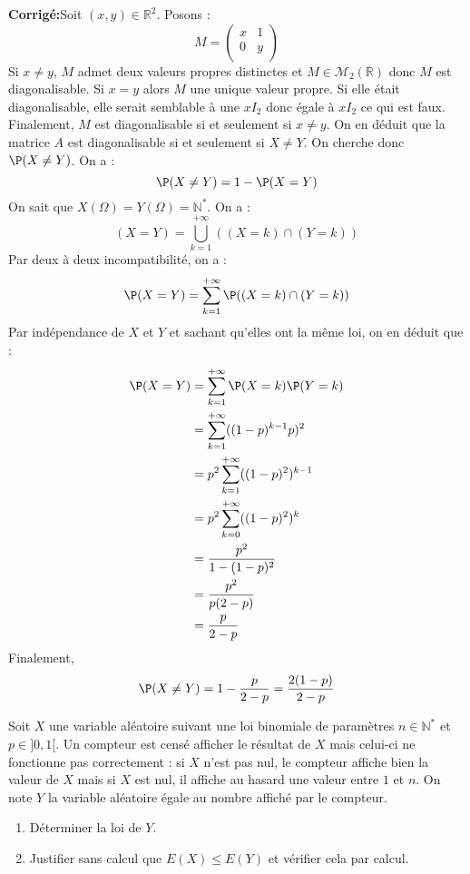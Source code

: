 \documentclass[a4paper,twoside,french,11pt]{VcCours}
\newcommand{\corr}{\textbf{Corrigé:}}
\begin{document}
\corr Soit $(x,y) \in \mathbb{R}^2$. Posons :
$$ M = \begin{pmatrix}
x & 1 \\
0 & y \\
\end{pmatrix}$$
Si $x \neq y$, $M$ admet deux valeurs propres distinctes et $M \in \mathcal{M}_2(\mathbb{R})$ donc $M$ est diagonalisable. Si $x=y$ alors $M$ une unique valeur propre. Si elle était diagonalisable, elle serait semblable à une $x I_2$ donc égale à $x I_2$ ce qui est faux. Finalement, $M$ est diagonalisable si et seulement si $x \ne y$. On en déduit que la matrice $A$ est diagonalisable si et seulement si $X \neq Y$. On cherche donc $\P(X \neq Y)$. On a :
$$ \P(X \neq Y) = 1 - \P(X=Y)$$
On sait que $X(\Omega)= Y(\Omega)= \mathbb{N}^*$. On a :
$$ (X=Y) = \bigcup_{k=1}^{+ \infty} ((X=k) \cap (Y=k))$$
Par deux à deux incompatibilité, on a :
$$  \P(X=Y) = \sum_{k=1}^{+ \infty} \P((X=k) \cap (Y=k))$$
Par indépendance de $X$ et $Y$ et sachant qu'elles ont la même loi, on en déduit que :
\begin{align*}
 \P(X=Y) & = \sum_{k=1}^{+ \infty} \P(X=k) \P(Y=k) \\
 & = \sum_{k=1}^{+ \infty} ((1-p)^{k-1} p)^2 \\
 & = p^2 \sum_{k=1}^{+ \infty} ((1-p)^{2})^{k-1} \\
 & = p^2 \sum_{k=0}^{+ \infty} ((1-p)^{2})^{k} \\
 & = \dfrac{p^2}{1-(1-p)^{2}}\\
 & = \dfrac{p^2}{p(2-p)} \\
 & = \dfrac{p}{2-p}
\end{align*}
Finalement,
$$ \P(X \neq Y) = 1 - \dfrac{p}{2-p} = \dfrac{2(1-p)}{2-p}$$

\begin{Exercice}{} Soit $X$ une variable aléatoire suivant une loi binomiale de paramètres $n \in \mathbb{N}^*$ et $p \in ]0,1[$. Un compteur est censé afficher le résultat de $X$ mais celui-ci ne fonctionne pas correctement : si $X$ n'est pas nul, le compteur affiche bien la valeur de $X$ mais si $X$ est nul, il affiche au hasard une valeur entre $1$ et $n$. On note $Y$ la variable aléatoire égale au nombre affiché par le compteur.

\begin{enumerate}
\item Déterminer la loi de $Y$.
\item Justifier sans calcul que $E(X) \leq E(Y)$ et vérifier cela par calcul.
\end{enumerate}
\end{Exercice}
\end{document}
